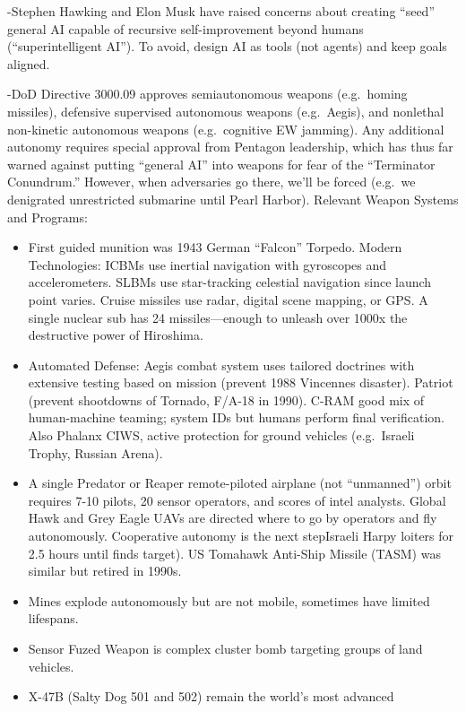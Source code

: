 \documentclass[
]{article}
\begin{document}
-Stephen Hawking and Elon Musk have raised concerns about creating
``seed'' general AI capable of recursive self-improvement beyond humans
(``superintelligent AI''). To avoid, design AI as tools (not agents) and
keep goals aligned.

-DoD Directive 3000.09 approves semiautonomous weapons (e.g.~homing
missiles), defensive supervised autonomous weapons (e.g.~Aegis), and
nonlethal non-kinetic autonomous weapons (e.g.~cognitive EW jamming).
Any additional autonomy requires special approval from Pentagon
leadership, which has thus far warned against putting ``general AI''
into weapons for fear of the ``Terminator Conundrum.'' However, when
adversaries go there, we'll be forced (e.g.~we denigrated unrestricted
submarine until Pearl Harbor). Relevant Weapon Systems and Programs:

\begin{itemize}
\item
  First guided munition was 1943 German ``Falcon'' Torpedo. Modern
  Technologies: ICBMs use inertial navigation with gyroscopes and
  accelerometers. SLBMs use star-tracking celestial navigation since
  launch point varies. Cruise missiles use radar, digital scene mapping,
  or GPS. A single nuclear sub has 24 missiles---enough to unleash over
  1000x the destructive power of Hiroshima.
\item
  Automated Defense: Aegis combat system uses tailored doctrines with
  extensive testing based on mission (prevent 1988 Vincennes disaster).
  Patriot (prevent shootdowns of Tornado, F/A-18 in 1990). C-RAM good
  mix of human-machine teaming; system IDs but humans perform final
  verification. Also Phalanx CIWS, active protection for ground vehicles
  (e.g.~Israeli Trophy, Russian Arena).
\item
  A single Predator or Reaper remote-piloted airplane (not ``unmanned'')
  orbit requires 7-10 pilots, 20 sensor operators, and scores of intel
  analysts. Global Hawk and Grey Eagle UAVs are directed where to go by
  operators and fly autonomously. Cooperative autonomy is the next
  stepIsraeli Harpy loiters for 2.5 hours until finds target). US
  Tomahawk Anti-Ship Missile (TASM) was similar but retired in 1990s.
\item
  Mines explode autonomously but are not mobile, sometimes have limited
  lifespans.
\item
  Sensor Fuzed Weapon is complex cluster bomb targeting groups of land
  vehicles.
\item
  X-47B (Salty Dog 501 and 502) remain the world's most advanced

\end{itemize}
\end{document}
